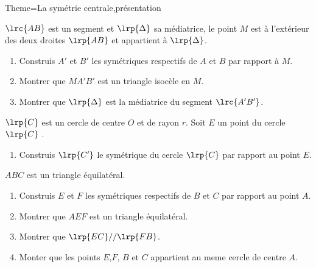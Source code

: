 \documentclass[a4paper,12pt]{article}
\begin{document}
\begin{Maquette}[Fiche]{Theme=La symétrie centrale,présentation}
\begin{exercice}%
$\lrc{AB}$ est un segment et $\lrp{\Delta}$ sa médiatrice, le point $M$ est à l'extérieur des deux droites $\lrp{AB}$ et appartient à $\lrp{\Delta}$.
\begin{enumerate}
\item  Construis $A'$ et $B'$ les symétriques respectifs de $A$ et $B$ par rapport à $M$.
\item Montrer que $MA'B'$ est un triangle isocèle en $M$.
\item Montrer que $\lrp{\Delta}$ est la médiatrice du segment $\lrc{A'B'}$.
\end{enumerate}
\end{exercice}

\begin{exercice}%
$\lrp{C}$ est un cercle de centre $O$ et de rayon $r$. Soit $E$ un point du cercle $\lrp{C}$ .
\begin{enumerate}
\item Construis $\lrp{C'}$ le symétrique du cercle $\lrp{C}$ par rapport au point $E$.
\end{enumerate}
\end{exercice}

\begin{exercice}
$ABC$ est un triangle équilatéral.
\begin{enumerate}
\item Construis $E$ et $F$  les symétriques respectifs  de $B$ et $C$ par rapport au point $A$.
\item Montrer que $AEF$ est un triangle équilatéral.
\item Montrer que $\lrp{EC} // \lrp{FB}$.
\item Monter que les points $E$,$F$, $B$ et $C$ appartient au meme cercle de centre $A$.
\end{enumerate}
\end{exercice}

\end{Maquette}
\end{document}
